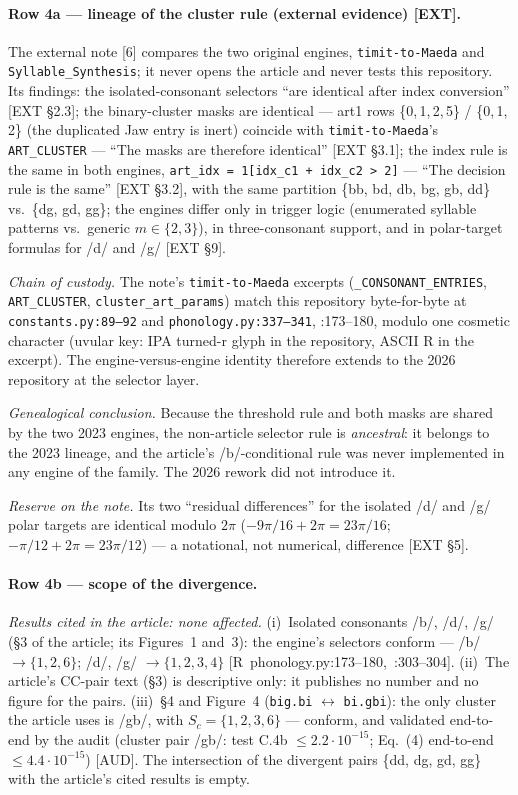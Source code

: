 \documentclass[11pt,letterpaper]{article}
\newcommand{\code}[1]{\texttt{#1}}
\begin{document}
\paragraph{Row 4a --- lineage of the cluster rule (external evidence) [EXT].}
The external note [6] compares the two original engines, \code{timit-to-Maeda}
and \code{Syllable\_Synthesis}; it never opens the article and never tests this
repository. Its findings: the isolated-consonant selectors ``are identical
after index conversion'' [EXT \S2.3]; the binary-cluster masks are identical
--- art1 rows \{0,\,1,\,2,\,5\} / \{0,\,1,\,2\} (the duplicated Jaw entry is
inert) coincide with \code{timit-to-Maeda}'s \code{ART\_CLUSTER} --- ``The
masks are therefore identical'' [EXT \S3.1]; the index rule is the same in
both engines, \code{art\_idx = 1[idx\_c1 + idx\_c2 > 2]} --- ``The decision
rule is the same'' [EXT \S3.2], with the same partition
\{bb, bd, db, bg, gb, dd\} vs.\ \{dg, gd, gg\}; the engines differ only in
trigger logic (enumerated syllable patterns vs.\ generic $m \in \{2,3\}$), in
three-consonant support, and in polar-target formulas for /d/ and /g/
[EXT \S9].

\emph{Chain of custody.} The note's \code{timit-to-Maeda} excerpts
(\code{\_CONSONANT\_ENTRIES}, \code{ART\_CLUSTER},
\code{cluster\_art\_params}) match this repository byte-for-byte at
\code{constants.py:89--92} and \code{phonology.py:337--341}, :173--180,
modulo one cosmetic character (uvular key: IPA turned-r glyph in the
repository, ASCII R in the excerpt). The engine-versus-engine identity
therefore extends to the 2026 repository at the selector layer.

\emph{Genealogical conclusion.} Because the threshold rule and both masks are
shared by the two 2023 engines, the non-article selector rule is
\emph{ancestral}: it belongs to the 2023 lineage, and the article's
/b/-conditional rule was never implemented in any engine of the family. The
2026 rework did not introduce it.

\emph{Reserve on the note.} Its two ``residual differences'' for the isolated
/d/ and /g/ polar targets are identical modulo $2\pi$
($-9\pi/16 + 2\pi = 23\pi/16$; $-\pi/12 + 2\pi = 23\pi/12$) --- a notational,
not numerical, difference [EXT \S5].

\paragraph{Row 4b --- scope of the divergence.}
\emph{Results cited in the article: none affected.}
(i)~Isolated consonants /b/, /d/, /g/ (\S3 of the article; its Figures~1
and~3): the engine's selectors conform --- /b/ $\to \{1,2,6\}$; /d/, /g/
$\to \{1,2,3,4\}$ \hbox{[R phonology.py:173--180, :303--304]}.
(ii)~The article's CC-pair text (\S3) is descriptive only: it publishes no
number and no figure for the pairs. (iii)~\S4 and Figure~4
(\code{big.bi} $\leftrightarrow$ \code{bi.gbi}): the only cluster the article
uses is /gb/, with $S_c = \{1,2,3,6\}$ --- conform, and validated end-to-end
by the audit (cluster pair /gb/: test C.4b $\le 2.2\cdot10^{-15}$; Eq.~(4)
end-to-end $\le 4.4\cdot10^{-15}$) \hbox{[AUD]}. The intersection of the
divergent pairs \{dd, dg, gd, gg\} with the article's cited results is empty.
\end{document}
